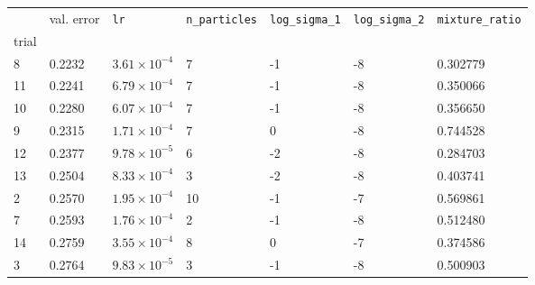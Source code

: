\begin{tabular}{lp{2.3cm}p{2.3cm}p{2.3cm}p{2.3cm}p{2.3cm}p{2.3cm}}
\toprule
{} &  val. error &         \texttt{lr} &  \texttt{n\_particles} &  \texttt{log\_sigma\_1} &  \texttt{log\_sigma\_2} &  \texttt{mixture\_ratio} \\
trial &             &                     &                        &                         &                         &                          \\
\midrule
8     &      0.2232 & $3.61\times10^{-4}$ &                      7 &                      -1 &                      -8 &                 0.302779 \\
11    &      0.2241 & $6.79\times10^{-4}$ &                      7 &                      -1 &                      -8 &                 0.350066 \\
10    &      0.2280 & $6.07\times10^{-4}$ &                      7 &                      -1 &                      -8 &                 0.356650 \\
9     &      0.2315 & $1.71\times10^{-4}$ &                      7 &                       0 &                      -8 &                 0.744528 \\
12    &      0.2377 & $9.78\times10^{-5}$ &                      6 &                      -2 &                      -8 &                 0.284703 \\
13    &      0.2504 & $8.33\times10^{-4}$ &                      3 &                      -2 &                      -8 &                 0.403741 \\
2     &      0.2570 & $1.95\times10^{-4}$ &                     10 &                      -1 &                      -7 &                 0.569861 \\
7     &      0.2593 & $1.76\times10^{-4}$ &                      2 &                      -1 &                      -8 &                 0.512480 \\
14    &      0.2759 & $3.55\times10^{-4}$ &                      8 &                       0 &                      -7 &                 0.374586 \\
3     &      0.2764 & $9.83\times10^{-5}$ &                      3 &                      -1 &                      -8 &                 0.500903 \\
\bottomrule
\end{tabular}
